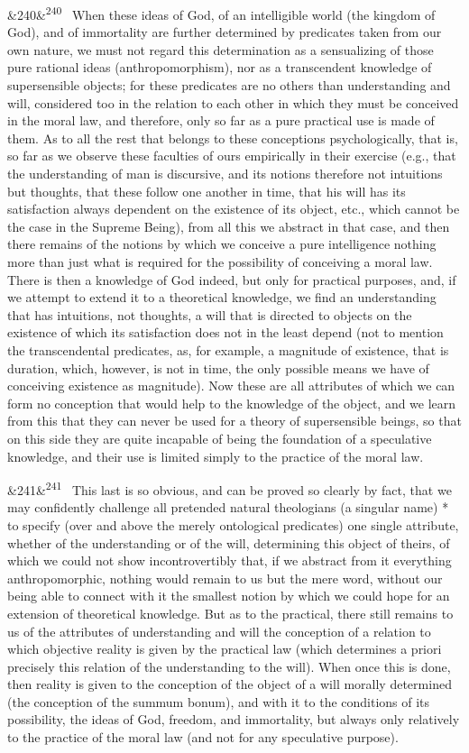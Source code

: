 \documentclass[12pt]{article}
\newcommand{\para}[1][]{\par\noindent\ifx&#1&\else\textsuperscript{\footnotesize #1}~\fi}
\begin{document}
\para[240] When these ideas of God, of an intelligible world (the kingdom of God), and of immortality are further determined by predicates taken from our own nature, we must not regard this determination as a sensualizing of those pure rational ideas (anthropomorphism), nor as a transcendent knowledge of supersensible objects; for these predicates are no others than understanding and will, considered too in the relation to each other in which they must be conceived in the moral law, and therefore, only so far as a pure practical use is made of them. As to all the rest that belongs to these conceptions psychologically, that is, so far as we observe these faculties of ours empirically in their exercise (e.g., that the understanding of man is discursive, and its notions therefore not intuitions but thoughts, that these follow one another in time, that his will has its satisfaction always dependent on the existence of its object, etc., which cannot be the case in the Supreme Being), from all this we abstract in that case, and then there remains of the notions by which we conceive a pure intelligence nothing more than just what is required for the possibility of conceiving a moral law. There is then a knowledge of God indeed, but only for practical purposes, and, if we attempt to extend it to a theoretical knowledge, we find an understanding that has intuitions, not thoughts, a will that is directed to objects on the existence of which its satisfaction does not in the least depend (not to mention the transcendental predicates, as, for example, a magnitude of existence, that is duration, which, however, is not in time, the only possible means we have of conceiving existence as magnitude). Now these are all attributes of which we can form no conception that would help to the knowledge of the object, and we learn from this that they can never be used for a theory of supersensible beings, so that on this side they are quite incapable of being the foundation of a speculative knowledge, and their use is limited simply to the practice of the moral law.

\para[241] This last is so obvious, and can be proved so clearly by fact, that we may confidently challenge all pretended natural theologians (a singular name) * to specify (over and above the merely ontological predicates) one single attribute, whether of the understanding or of the will, determining this object of theirs, of which we could not show incontrovertibly that, if we abstract from it everything anthropomorphic, nothing would remain to us but the mere word, without our being able to connect with it the smallest notion by which we could hope for an extension of theoretical knowledge. But as to the practical, there still remains to us of the attributes of understanding and will the conception of a relation to which objective reality is given by the practical law (which determines a priori precisely this relation of the understanding to the will). When once this is done, then reality is given to the conception of the object of a will morally determined (the conception of the summum bonum), and with it to the conditions of its possibility, the ideas of God, freedom, and immortality, but always only relatively to the practice of the moral law (and not for any speculative purpose).
\end{document}
